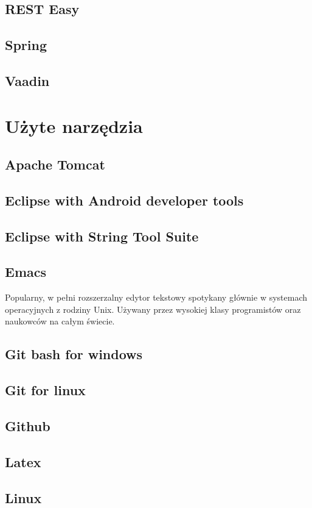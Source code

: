 \documentclass[11pt,a4paper,polish,thesis]{dcsbook}
\begin{document}
\subsection{REST Easy}
\subsection{Spring}
\subsection{Vaadin}

\section{Użyte narzędzia}
\subsection{Apache Tomcat}
\subsection{Eclipse with Android developer tools}
\subsection{Eclipse with String Tool Suite}
\subsection{Emacs}
Popularny, w pełni rozszerzalny edytor tekstowy spotykany głównie w systemach operacyjnych z rodziny Unix. Używany przez wysokiej klasy programistów oraz naukowców na całym świecie.
\subsection{Git bash for windows}
\subsection{Git for linux}
\subsection{Github}
\subsection{Latex}
\subsection{Linux}
\end{document}

